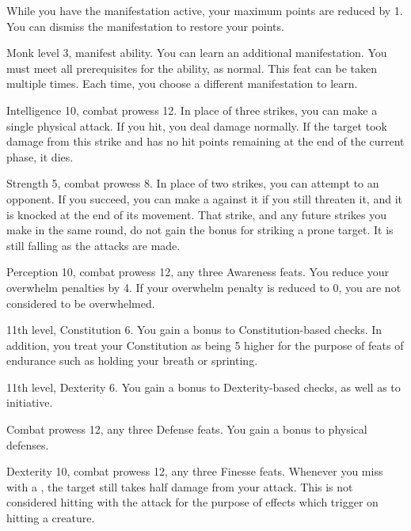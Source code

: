 While you have the manifestation active, your maximum \ki points are reduced by 1.
You can dismiss the manifestation to restore your \ki points.

\featpres Monk level 3, manifest \ki ability.
\featben You can learn an additional \ki manifestation.
You must meet all prerequisites for the ability, as normal.
 This feat can be taken multiple times.
Each time, you choose a different \ki manifestation to learn.

\featpres Intelligence 10, combat prowess 12.
\featben In place of three strikes, you can make a single physical attack.
If you hit, you deal damage normally.
If the target took damage from this strike and has no hit points remaining at the end of the current phase, it dies.

\featpres Strength 5, combat prowess 8.
\featben In place of two strikes, you can attempt to  an opponent.
If you succeed, you can make a  against it if you still threaten it, and it is knocked \prone at the end of its movement.
That strike, and any future strikes you make in the same round, do not gain the bonus for striking a prone target.
It is still falling as the attacks are made.

\featpres Perception 10, combat prowess 12, any three Awareness feats.
\featben You reduce your overwhelm penalties by 4.
If your overwhelm penalty is reduced to 0, you are not considered to be overwhelmed.

\featpres 11th level, Constitution 6.
\featben You gain a  bonus to Constitution-based checks.
In addition, you treat your Constitution as being 5 higher for the purpose of feats of endurance such as holding your breath or sprinting.

\featpres 11th level, Dexterity 6.
\featben You gain a  bonus to Dexterity-based checks, as well as to initiative.

\featpres Combat prowess 12, any three Defense feats.
\featben You gain a  bonus to physical defenses.

\featpres Dexterity 10, combat prowess 12, any three Finesse feats.
\featben Whenever you miss with a , the target still takes half damage from your attack.
This is not considered hitting with the attack for the purpose of effects which trigger on hitting a creature.


